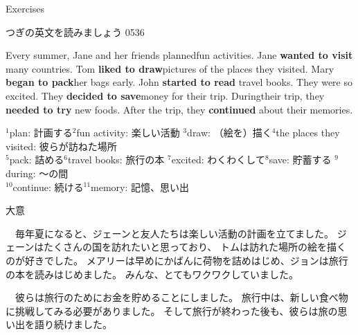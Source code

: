 \documentclass[aspectratio=169,xcolor={dvipsnames,table}]{beamer}
\begin{document}
\begin{frame}[plain,t]{Exercises}

{\small つぎの英文を読みましょう}%
\hfill{\tiny 0536}\,{\scriptsize {}}

\begin{tcolorbox}
Every summer, Jane and her friends planned\footnotemark[1] fun activities\footnotemark[2].
Jane {\bfseries wanted to visit} many countries.
Tom {\bfseries liked to draw}\footnotemark[3] pictures of the places they visited\footnotemark[4].
Mary {\bfseries began to pack}\footnotemark[5] her bags early.
John {\bfseries started to read} travel books\footnotemark[6].
They were so excited\footnotemark[7].
They {\bfseries decided to save}\footnotemark[8] money for their trip.
During\footnotemark[9] their trip, they {\bfseries needed to try} new foods.
After the trip, they {\bfseries continued} about their memories\footnotemark[11].
\end{tcolorbox}

\vspace*{40pt}
\scriptsize
$^{1}$plan: 計画する\hfill{}$^{2}$fun activity: 楽しい活動\hfill{}%
$^{3}$draw: （絵を）描く\hfill$^{4}$the places they visited: 彼らが訪ねた場所\\%
$^{5}$pack: 詰める\hfill{}$^{6}$travel books: 旅行の本\hfill{}%
$^{7}$excited: わくわくして\hfill{}$^{8}$save: 貯蓄する\hfill%
$^{9}$during: ～の間\\
$^{10}$continue: 続ける\hspace{20pt}$^{11}$memory: 記憶、思い出

\end{frame}
\begin{frame}[plain]{大意}
 
\begin{tcolorbox}
　毎年夏になると、ジェーンと友人たちは楽しい活動の計画を立てました。
 ジェーンはたくさんの国を訪れたいと思っており、
トムは訪れた場所の絵を描くのが好きでした。
メアリーは早めにかばんに荷物を詰めはじめ、ジョンは旅行の本を読みはじめました。
みんな、とてもワクワクしていました。

\smallskip

　彼らは旅行のためにお金を貯めることにしました。
旅行中は、新しい食べ物に挑戦してみる必要がありました。
そして旅行が終わった後も、彼らは旅の思い出を語り続けました。
\end{tcolorbox}

\end{frame}
\end{document}
